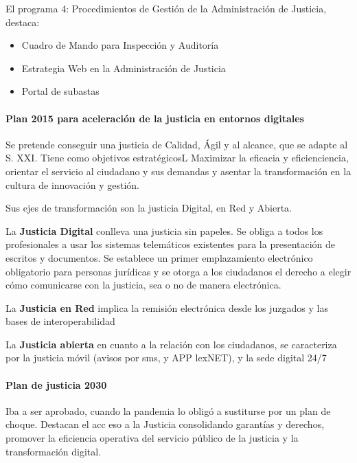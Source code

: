             El programa 4: Procedimientos de Gestión de la Administración de Justicia, destaca:
            \begin{itemize}
                \item Cuadro de Mando para Inspección y Auditoría
                \item Estrategia Web en la Administración de Justicia
                \item Portal de subastas
            \end{itemize}

        \paragraph{Plan 2015 para aceleración de la justicia en entornos digitales} %
            Se pretende conseguir una justicia de Calidad, Ágil y al alcance, que se adapte al S. XXI. Tiene como objetivos estratégicosL Maximizar la eficacia y eficienciencia, orientar el servicio al ciudadano y sus demandas y asentar la transformación en la cultura de innovación y gestión.

            Sus ejes de transformación son la justicia Digital, en Red y Abierta.

            La \textbf{Justicia Digital} conlleva una justicia sin papeles. Se obliga a todos los profesionales a usar los sistemas telemáticos existentes para la presentación de escritos y documentos. Se establece un primer emplazamiento electrónico obligatorio para personas jurídicas y se otorga a los ciudadanos el derecho a elegir cómo comunicarse con la justicia, sea o no de manera electrónica.

            La \textbf{Justicia en Red} implica la remisión electrónica desde los juzgados y las bases de interoperabilidad

            La \textbf{Justicia abierta} en cuanto a la relación con los ciudadanos, se caracteriza por la justicia móvil (avisos por sms, y APP lexNET), y la sede digital 24/7

        \paragraph{Plan de justicia 2030} %
            Iba a ser aprobado, cuando la pandemia lo obligó a sustiturse por un plan de choque. Destacan el acc eso a la Justicia consolidando garantías y derechos, promover la eficiencia operativa del servicio público de la justicia y la transformación digital.

